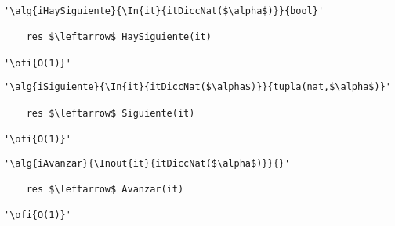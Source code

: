 \begin{lstlisting}[mathescape]
'\alg{iHaySiguiente}{\In{it}{itDiccNat($\alpha$)}}{bool}'

	res $\leftarrow$ HaySiguiente(it)

'\ofi{O(1)}'
\end{lstlisting}

\begin{lstlisting}[mathescape]
'\alg{iSiguiente}{\In{it}{itDiccNat($\alpha$)}}{tupla(nat,$\alpha$)}'

	res $\leftarrow$ Siguiente(it)

'\ofi{O(1)}'
\end{lstlisting}

\begin{lstlisting}[mathescape]
'\alg{iAvanzar}{\Inout{it}{itDiccNat($\alpha$)}}{}'

	res $\leftarrow$ Avanzar(it)

'\ofi{O(1)}'
\end{lstlisting}

